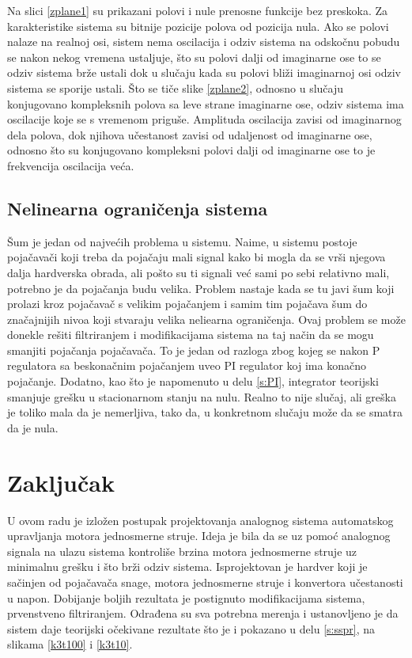\documentclass[a4paper, 12pt, diplomski]{etf}
\begin{document}
Na slici \ref{zplane1} su prikazani polovi i nule prenosne funkcije bez preskoka. Za karakteristike sistema su bitnije pozicije polova od pozicija nula. Ako se polovi nalaze na realnoj osi, sistem nema oscilacija i odziv sistema na odskočnu pobudu se nakon nekog vremena ustaljuje, što su polovi dalji od imaginarne ose to se odziv sistema brže ustali dok u slučaju kada su polovi bliži imaginarnoj osi odziv sistema se sporije ustali. Što se tiče slike \ref{zplane2}, odnosno u slučaju konjugovano kompleksnih polova sa leve strane imaginarne ose, odziv sistema ima oscilacije koje se s vremenom priguše. Amplituda oscilacija zavisi od imaginarnog dela polova, dok njihova učestanost zavisi od udaljenost od imaginarne ose, odnosno što su konjugovano kompleksni polovi dalji od imaginarne ose to je frekvencija oscilacija veća. \cite{octave}



\subsection{Nelinearna ograničenja sistema}

Šum je jedan od najvećih problema u sistemu. Naime, u sistemu postoje pojačavači koji treba da pojačaju mali signal kako bi mogla da se vrši njegova dalja hardverska obrada, ali pošto su ti signali već sami po sebi relativno mali, potrebno je da pojačanja budu velika. Problem nastaje kada se tu javi šum koji prolazi kroz pojačavač s velikim pojačanjem i samim tim pojačava šum do značajnijih nivoa koji stvaraju velika neliearna ograničenja. Ovaj problem se može donekle rešiti filtriranjem i modifikacijama sistema na taj način da se mogu smanjiti pojačanja pojačavača. To je jedan od razloga zbog kojeg se nakon P regulatora sa beskonačnim pojačanjem uveo PI regulator koj ima konačno pojačanje. Dodatno, kao što je napomenuto u delu \ref{s:PI}, integrator teorijski smanjuje grešku u stacionarnom stanju na nulu. Realno to nije slučaj, ali greška je toliko mala da je nemerljiva, tako da, u konkretnom slučaju može da se smatra da je nula.
\cite{osc} 
\cite{gen} 
\cite{arduino}
\cite{coolTerm}



\break

\section{Zaključak}

U ovom radu je izložen postupak projektovanja analognog sistema automatskog upravljanja motora jednosmerne struje. Ideja je bila da se uz pomoć analognog signala na ulazu sistema kontroliše brzina motora jednosmerne struje uz minimalnu grešku i što brži odziv sistema. Isprojektovan je hardver koji je sačinjen od pojačavača snage, motora jednosmerne struje i konvertora učestanosti u napon. Dobijanje boljih rezultata je postignuto modifikacijama sistema, prvenstveno filtriranjem. Odrađena su sva potrebna merenja i ustanovljeno je da sistem daje teorijski očekivane rezultate što je i pokazano u delu \ref{s:sspr}, na slikama \ref{k3t100} i \ref{k3t10}.
\end{document}
